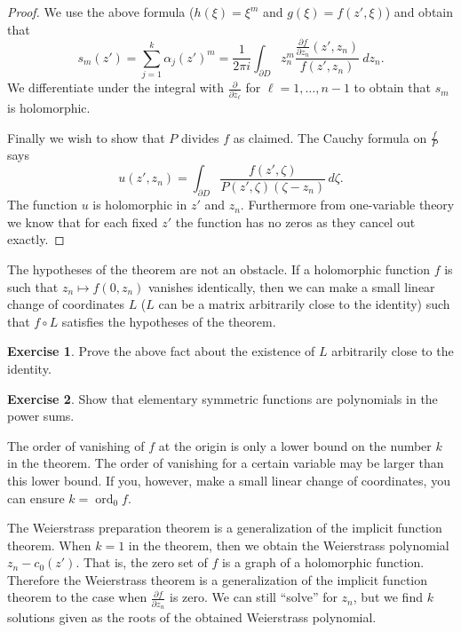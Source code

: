 \documentclass[12pt,openany]{book}
\newcommand{\ord}{\operatorname{ord}}
\theoremstyle{plain}
\theoremstyle{remark}
\theoremstyle{definition}
\newenvironment{exbox}{%
    \def\FrameCommand{\vrule width 1pt \relax\hspace {10pt}}%
    \MakeFramed {\advance \hsize -\width \FrameRestore }%
}{%
    \endMakeFramed
}
\theoremstyle{exercise}
\newtheorem{exercise}{Exercise}[section]
\theoremstyle{example}
\begin{document}
\begin{proof}
We use the above formula ($h(\xi) = \xi^m$ and $g(\xi)=f(z',\xi)$) and obtain that
\begin{equation*}
s_m(z') = 
\sum_{j=1}^k \alpha_j{(z')}^m
=
\frac{1}{2\pi i}
\int_{\partial D}
z_n^m
\frac{\frac{\partial f}{\partial z_n} (z',z_n)}{f(z',z_n)} ~dz_n .
\end{equation*}
We differentiate under the integral
with $\frac{\partial}{\partial\bar{z}_\ell}$
for $\ell=1,\ldots,{n-1}$
to obtain that $s_m$
is holomorphic.

Finally we wish to show that $P$ divides $f$ as claimed.  The Cauchy
formula on $\frac{f}{P}$ says
\begin{equation*}
u(z',z_n) = \int_{\partial D} \frac{f(z',\zeta)}{P(z',\zeta)(\zeta-z_n)} \, d\zeta .
\end{equation*}
The function $u$ is holomorphic in $z'$ and $z_n$.  Furthermore from
one-variable theory we know that for each fixed $z'$ the function has no zeros
as they cancel out exactly.
\end{proof}

The hypotheses of the theorem are not an obstacle.  If a holomorphic
function $f$ is such that $z_n \mapsto f(0,z_n)$ vanishes identically,
then we can make a small linear change of
coordinates $L$ ($L$ can be a matrix arbitrarily close to the identity) such
that $f \circ L$ satisfies the hypotheses of the theorem.

\begin{exbox}
\begin{exercise}
Prove the above fact about the existence of $L$ arbitrarily close to the
identity.
\end{exercise}

\begin{exercise}
Show that elementary symmetric functions are polynomials in the power sums.
\end{exercise}
\end{exbox}

The order of vanishing of $f$ at the origin is only a lower bound
on the number $k$ in the theorem.  The order of vanishing for a certain
variable may be larger than this lower bound.  If you, however, make a small
linear change of coordinates, you can ensure $k = \ord_0 f$.

The Weierstrass preparation theorem is a generalization of
the implicit function theorem.  When $k=1$ in the theorem, then we obtain
the Weierstrass polynomial $z_n - c_0(z')$.  That is, the zero set of 
$f$ is a graph of a holomorphic function.
Therefore the Weierstrass theorem is a generalization of the
implicit function theorem to the case when $\frac{\partial f}{\partial z_n}$
is zero.  We can still ``solve'' for $z_n$, but we find $k$ solutions
given as the roots of the obtained Weierstrass polynomial.
\end{document}
